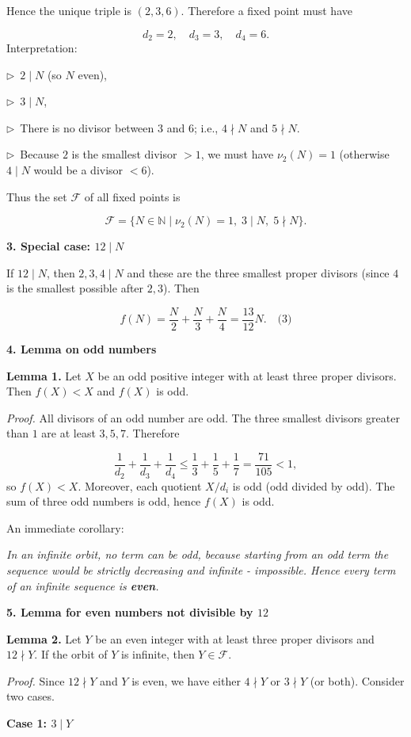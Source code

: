 \documentclass{llmxive}
\providecommand{\solutionheading}[1]{\par\smallskip\noindent\textbf{#1}\par}
\providecommand{\compactbullet}[1]{\par\noindent$\triangleright$~#1\par}
\begin{document}
Hence the unique triple is \((2,3,6)\). Therefore a fixed point must have\par
\[
d_2=2,\quad d_3=3,\quad d_4=6.
\]
Interpretation:\par
\compactbullet{\(2\mid N\) (so \(N\) even),}
\compactbullet{\(3\mid N\),}
\compactbullet{There is no divisor between \(3\) and \(6\); i.e., \(4\nmid N\) and \(5\nmid N\).}
\compactbullet{Because \(2\) is the smallest divisor \(>1\), we must have \(\nu_2(N)=1\) (otherwise \(4\mid N\) would be a divisor \(<6\)).}
Thus the set \(\mathcal{F}\) of all fixed points is\par
\[
\boxed{\mathcal{F}=\bigl\{N\in\mathbb{N}\;\big|\; \nu_2(N)=1,\;3\mid N,\;5\nmid N\bigr\}.}
\]
\smallskip
\solutionheading{3. Special case: \(12\mid N\)}
If \(12\mid N\), then \(2,3,4\mid N\) and these are the three smallest proper divisors (since \(4\) is the smallest possible after \(2,3\)). Then\par
\[
f(N)=\frac{N}{2}+\frac{N}{3}+\frac{N}{4}=\frac{13}{12}N. \quad\text{(3)}
\]
\smallskip
\solutionheading{4. Lemma on odd numbers}
\textbf{Lemma 1.} Let \(X\) be an odd positive integer with at least three proper divisors. Then \(f(X)<X\) and \(f(X)\) is odd.\par
\emph{Proof.} All divisors of an odd number are odd. The three smallest divisors greater than \(1\) are at least \(3,5,7\). Therefore\par
\[
\frac{1}{d_2}+\frac{1}{d_3}+\frac{1}{d_4}\le\frac{1}{3}+\frac{1}{5}+\frac{1}{7}=\frac{71}{105}<1,
\]
so \(f(X)<X\). Moreover, each quotient \(X/d_i\) is odd (odd divided by odd). The sum of three odd numbers is odd, hence \(f(X)\) is odd.\par
An immediate corollary:\par
\par\noindent\emph{In an infinite orbit, no term can be odd, because starting from an odd term the sequence would be strictly decreasing and infinite - impossible. Hence every term of an infinite sequence is \textbf{even}.}\par
\smallskip
\solutionheading{5. Lemma for even numbers not divisible by \(12\)}
\textbf{Lemma 2.} Let \(Y\) be an even integer with at least three proper divisors and \(12\nmid Y\). If the orbit of \(Y\) is infinite, then \(Y\in\mathcal{F}\).\par
\emph{Proof.} Since \(12\nmid Y\) and \(Y\) is even, we have either \(4\nmid Y\) or \(3\nmid Y\) (or both). Consider two cases.\par
\solutionheading{Case 1: \(3\mid Y\)}
\end{document}
